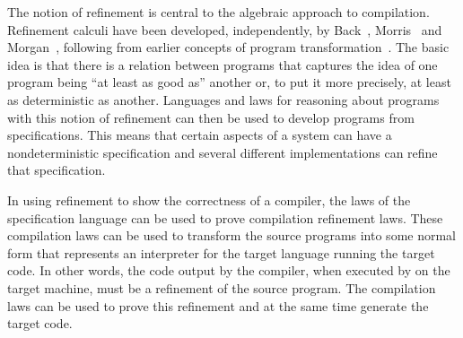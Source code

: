 \documentclass[a4paper,10pt]{report}
\begin{document}
The notion of refinement is central to the algebraic approach to
compilation.
Refinement calculi have been developed, independently, by
Back~\cite{back1981}, Morris~\cite{morris1987} and
Morgan~\cite{morgan1990}, following from earlier concepts of program
transformation~\cite{bauer1976, balzer1976, standish1976, arsac1979}.
The basic idea is that there is a relation between programs that
captures the idea of one program being ``at least as good as'' another
or, to put it more precisely, at least as deterministic as another.
Languages and laws for reasoning about programs with this notion of
refinement can then be used to develop programs from specifications.
This means that certain aspects of a system can have a
nondeterministic specification and several different implementations
can refine that specification.

In using refinement to show the correctness of a compiler, the laws of
the specification language can be used to prove compilation refinement
laws.
These compilation laws can be used to transform the source programs
into some normal form that represents an interpreter for the target
language running the target code.
In other words, the code output by the compiler, when executed by on
the target machine, must be a refinement of the source program.
The compilation laws can be used to prove this refinement and at the
same time generate the target code.
\end{document}
